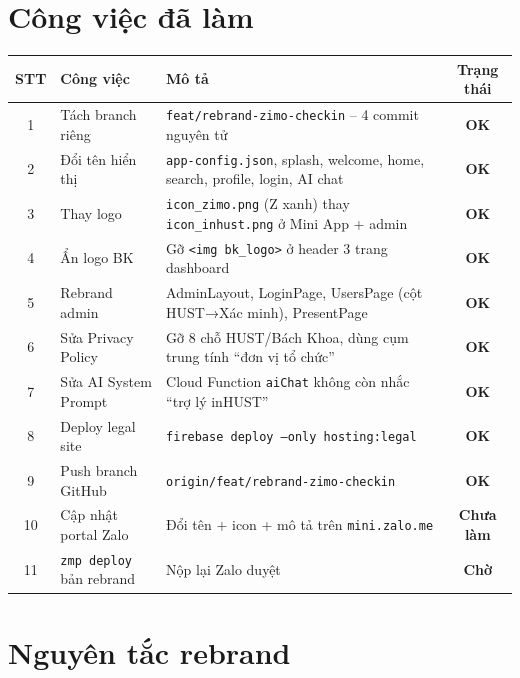 \documentclass{article}
\begin{document}
\section{Công việc đã làm}

\begin{center}
\begin{tabularx}{\textwidth}{@{}c l X c@{}}
\toprule
\textbf{STT} & \textbf{Công việc} & \textbf{Mô tả} & \textbf{Trạng thái} \\
\midrule
1 & Tách branch riêng & \texttt{feat/rebrand-zimo-checkin} -- 4 commit nguyên tử & \textcolor{statusgreen}{\textbf{OK}} \\
2 & Đổi tên hiển thị & \texttt{app-config.json}, splash, welcome, home, search, profile, login, AI chat & \textcolor{statusgreen}{\textbf{OK}} \\
3 & Thay logo & \texttt{icon\_zimo.png} (Z xanh) thay \texttt{icon\_inhust.png} ở Mini App + admin & \textcolor{statusgreen}{\textbf{OK}} \\
4 & Ẩn logo BK & Gỡ \texttt{<img bk\_logo>} ở header 3 trang dashboard & \textcolor{statusgreen}{\textbf{OK}} \\
5 & Rebrand admin & AdminLayout, LoginPage, UsersPage (cột HUST→Xác minh), PresentPage & \textcolor{statusgreen}{\textbf{OK}} \\
6 & Sửa Privacy Policy & Gỡ 8 chỗ HUST/Bách Khoa, dùng cụm trung tính ``đơn vị tổ chức'' & \textcolor{statusgreen}{\textbf{OK}} \\
7 & Sửa AI System Prompt & Cloud Function \texttt{aiChat} không còn nhắc ``trợ lý inHUST'' & \textcolor{statusgreen}{\textbf{OK}} \\
8 & Deploy legal site & \texttt{firebase deploy --only hosting:legal} & \textcolor{statusgreen}{\textbf{OK}} \\
9 & Push branch GitHub & \texttt{origin/feat/rebrand-zimo-checkin} & \textcolor{statusgreen}{\textbf{OK}} \\
10 & Cập nhật portal Zalo & Đổi tên + icon + mô tả trên \texttt{mini.zalo.me} & \textcolor{statusamber}{\textbf{Chưa làm}} \\
11 & \texttt{zmp deploy} bản rebrand & Nộp lại Zalo duyệt & \textcolor{statusamber}{\textbf{Chờ}} \\
\bottomrule
\end{tabularx}
\end{center}

\section{Nguyên tắc rebrand}
\end{document}
